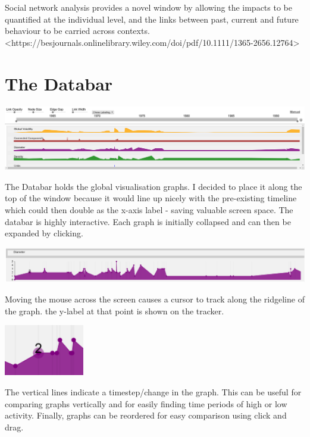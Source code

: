Social network analysis provides a novel window by allowing the impacts to be quantified at the individual level, and the links between past, current and future behaviour to be carried across contexts. <https://besjournals.onlinelibrary.wiley.com/doi/pdf/10.1111/1365-2656.12764>


\section{The Databar}

\begin{center}
\includegraphics[trim={0 0 0 0}, width=140mm]{./Figures/databar.png}
\end{center}

The Databar holds the global visualisation graphs. I decided to place it along the top of the window because it would line up nicely with the pre-existing timeline which could then double as the x-axis label - saving valuable screen space.
The databar is highly interactive. Each graph is initially collapsed and can then be expanded by clicking.
\begin{center}
\includegraphics[trim={0 0 0 0}, width=140mm]{./Figures/diameterGraph.png}
\end{center}
Moving the mouse across the screen causes a cursor to track along the ridgeline of the graph. the y-label at that point is shown on the tracker.
\begin{center}
\includegraphics[trim={0 0 0 0}, width=35mm]{./Figures/ridgeTracker.png}
\end{center}
The vertical lines indicate a timestep/change in the graph. This can be useful for comparing graphs vertically and for easily finding time periods of high or low activity.
Finally, graphs can be reordered for easy comparison using click and drag.

